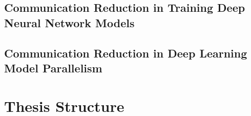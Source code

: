 \subsection{Communication Reduction in Training Deep Neural Network Models}

\subsection{Communication Reduction in Deep Learning Model Parallelism}


\section{Thesis Structure}
%
